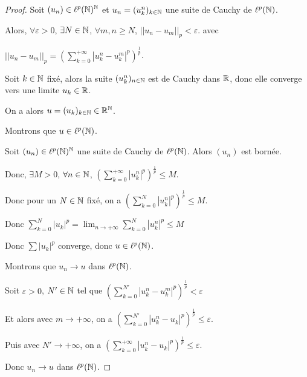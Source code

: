 \begin{proof}
    Soit $(u_n) \in \ell^p(\mathbb{N})^{\mathbb{N}}$ et $u_n = (u_k^n)_{k \in \mathbb{N}}$ une suite de Cauchy de $\ell^p(\mathbb{N})$.

    Alors, $\forall \varepsilon > 0$, $\exists N \in \mathbb{N}$, $\forall m,n \geqslant N$, 
    $||u_n - u_m||_p < \varepsilon$.
    avec 
    
    $\displaystyle ||u_n - u_m||_p = \left( \sum_{k=0}^{+\infty} |u_k^n - u_k^m|^p \right)^{\frac{1}{p}}$.

    Soit $k \in \mathbb{N}$ fixé, alors la suite $(u_k^n)_{n \in \mathbb{N}}$ est de Cauchy dans $\mathbb{R}$, donc elle converge vers une limite $u_k \in \mathbb{R}$.

    On a alors $u = (u_k)_{k \in \mathbb{N}} \in \mathbb{R}^{\mathbb{N}}$.

     Montrons que $u \in \ell^p(\mathbb{N})$.

    \svspace Soit $(u_n) \in \ell^p(\mathbb{N})^{\mathbb{N}}$ une suite de Cauchy de $\ell^p(\mathbb{N})$. Alors $(u_n)$ est bornée. 

    Donc, $\displaystyle \exists M > 0$, 
    $\forall n \in \mathbb{N}$, $\displaystyle \left( \sum_{k = 0 }^{+ \infty } |u_k^n|^p \right)^{\frac 1 p} \leqslant M$.

    Donc pour un $N \in \mathbb{N}$ fixé, on a $\displaystyle \left( \sum_{k=0}^{N} |u_k^n|^p \right)^{\frac 1 p} \leqslant M$.
    
    Donc $\displaystyle \sum_{k=0}^{N} |u_k|^p = \lim_{n \to +\infty} \sum_{k=0}^{N} |u_k^n|^p \leqslant M$

    Donc $\displaystyle \sum |u_k|^p$ converge, donc $u \in \ell^p(\mathbb{N})$.

     Montrons que $u_n \to u$ dans $\ell^p(\mathbb{N})$.

    \svspace Soit $\varepsilon > 0$, $N' \in \mathbb{N}$ tel que 
    $\displaystyle \left( \sum_{ k = 0 }^{N'} |u_k^n - u_k^m|^p \right)^{\frac 1 p} < \varepsilon$

    Et alors avec $m \to +\infty$, on a 
    $\displaystyle \left( \sum_{ k = 0 }^{N'} |u_k^n - u_k|^p \right)^{\frac 1 p} \leqslant \varepsilon$.

    Puis avec $N' \to +\infty$, on a 
    $\displaystyle \left( \sum_{ k = 0 }^{+\infty} |u_k^n - u_k|^p \right)^{\frac 1 p} \leqslant \varepsilon$.

    Donc $u_n \to u$ dans $\ell^p(\mathbb{N})$.

\end{proof}

